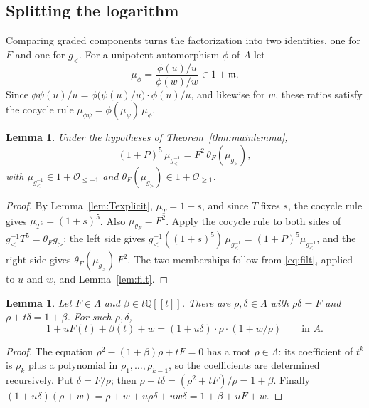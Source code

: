 \documentclass[11pt]{article}
\newtheorem{lemma}[theorem]{Lemma}
\theoremstyle{definition}
\theoremstyle{remark}
\numberwithin{equation}{section}
\newcommand{\Q}{\mathbb{Q}}
\newcommand{\ps}[1]{\Q[\![#1]\!]}
\newcommand{\m}{\mathfrak{m}}
\newcommand{\Oge}[1]{\mathcal{O}_{\geq #1}}
\newcommand{\Ole}[1]{\mathcal{O}_{\leq #1}}
\newcommand{\gl}{g_{<}}
\newcommand{\gr}{g_{>}}
\begin{document}
\subsection{Splitting the logarithm}\label{sec:split}

Comparing graded components turns the factorization into two identities,
one for $F$ and one for $\gl$. For a unipotent
automorphism $\phi$ of $A$ let
\[
  \mu_\phi=\frac{\phi(u)/u}{\phi(w)/w}\in1+\m .
\]
Since $\phi\psi(u)/u=\phi\big(\psi(u)/u\big)\cdot\phi(u)/u$, and
likewise for $w$, these ratios satisfy the cocycle rule
$\mu_{\phi\psi}=\phi(\mu_\psi)\,\mu_\phi$.

\begin{lemma}\label{lem:cocycle}
Under the hypotheses of Theorem~\ref{thm:mainlemma},
\begin{equation}\label{eq:cocycle}
  (1+P)^5\,\mu_{\gl^{-1}}=F^2\,\theta_F(\mu_{\gr}),
\end{equation}
with $\mu_{\gl^{-1}}\in1+\Ole{-1}$ and $\theta_F(\mu_{\gr})\in1+\Oge1$.
\end{lemma}

\begin{proof}
By Lemma~\ref{lem:Texplicit}, $\mu_T=1+s$, and since $T$ fixes $s$, the
cocycle rule gives $\mu_{T^5}=(1+s)^5$. Also $\mu_{\theta_F}=F^2$. Apply
the cocycle rule to both sides of $\gl^{-1}T^5=\theta_F\gr$: the left side
gives $\gl^{-1}((1+s)^5)\,\mu_{\gl^{-1}}=(1+P)^5\mu_{\gl^{-1}}$, and the
right side gives $\theta_F(\mu_{\gr})\,F^2$. The two memberships follow
from \eqref{eq:filt}, applied to $u$ and $w$, and Lemma~\ref{lem:filt}.
\end{proof}

\begin{lemma}\label{lem:quadratic}
Let $F\in\Lambda$ and $\beta\in t\ps{t}$. There are
$\rho,\delta\in\Lambda$ with $\rho\delta=F$ and $\rho+t\delta=1+\beta$.
For such $\rho,\delta$,
\begin{equation}\label{eq:factor1P}
  1+uF(t)+\beta(t)+w=(1+u\delta)\cdot\rho\cdot(1+w/\rho)\qquad\text{in }A.
\end{equation}
\end{lemma}

\begin{proof}
The equation $\rho^2-(1+\beta)\rho+tF=0$ has a root $\rho\in\Lambda$: its
coefficient of $t^k$ is $\rho_k$ plus a polynomial in
$\rho_1,\dots,\rho_{k-1}$, so the coefficients are determined
recursively. Put $\delta=F/\rho$; then $\rho+t\delta=(\rho^2+tF)/\rho=1+\beta$.
Finally $(1+u\delta)(\rho+w)=\rho+w+u\rho\delta+uw\delta=1+\beta+uF+w$.
\end{proof}
\end{document}

